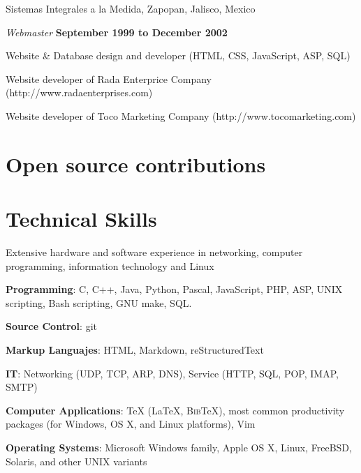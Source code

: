 \blankline

Sistemas Integrales a la Medida, Zapopan, Jalisco, Mexico
\begin{outerlist}
\item[] \textit{Webmaster }%
    \hfill \textbf{September 1999 to December 2002 }
    \begin{innerlist}
        \item Website \& Database design and developer
              (HTML, CSS, JavaScript, ASP, SQL)
        \item Website developer of Rada Enterprice Company
              (http://www.radaenterprises.com)
        \item Website developer of Toco Marketing Company
              (http://www.tocomarketing.com)
    \end{innerlist}
\end{outerlist}

\section{Open source contributions}


\section{Technical Skills}
%
Extensive hardware and software experience in networking, computer
programming, information technology and Linux

\blankline

\textbf{Programming}: C, C++, Java, Python, Pascal, JavaScript, PHP, ASP,
        UNIX scripting, Bash scripting, GNU make, SQL.

\blankline

\textbf{Source Control}: git

\blankline

\textbf{Markup Languajes}: HTML, Markdown, reStructuredText

\blankline

\textbf{IT}: Networking (UDP, TCP, ARP, DNS),
Service (HTTP, SQL, POP, IMAP, SMTP)

\blankline

\textbf{Computer Applications}: \TeX{} (\LaTeX{}, B\textsc{ib}\TeX{}),
        most common productivity packages (for Windows, OS X, and Linux
        platforms), Vim

\blankline

\textbf{Operating Systems}: Microsoft Windows family, Apple OS X, Linux, FreeBSD,
        Solaris, and other UNIX variants


